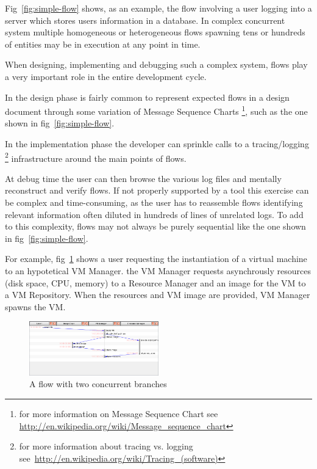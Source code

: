 \documentclass[11pt, twoside, titlepage]{book}
\begin{document}
Fig~\ref{fig:simple-flow} shows, as an example, the flow involving a user
logging into a server which stores users information in a database. 
In complex concurrent system multiple homogeneous or heterogeneous flows
spawning tens or hundreds of entities may be in execution at any point in time.  
  
When designing, implementing and debugging such a complex system, flows play a
very important role in the entire development cycle. 

In the design phase is fairly common to represent expected flows in a design
document through some variation of Message Sequence Charts
\footnote{for more information on Message Sequence Chart see~
\href{http://en.wikipedia.org/wiki/Message\_sequence\_chart}
{http://en.wikipedia.org/wiki/Message\_sequence\_chart}}, such as the one shown
in fig~\ref{fig:simple-flow}.

In the implementation phase the developer can sprinkle calls to a
tracing/logging \footnote{ for more information about tracing vs.
logging
see~\href{http://en.wikipedia.org/wiki/Tracing\_(software)}
{http://en.wikipedia.org/wiki/Tracing\_(software)}} infrastructure
around the main points of flows.
  
At debug time
the user can then browse the various log files and mentally reconstruct and
verify flows. If not properly supported by a tool this exercise can be complex
and time-consuming, as the user has to reassemble flows identifying relevant
information often diluted in hundreds of lines of unrelated logs. To add to this
complexity, flows may not always be purely sequential like the one shown in
fig~\ref{fig:simple-flow}. 

For example, fig~\ref{fig:concurrent-flow} shows a user requesting the
instantiation of a virtual machine to an hypotetical VM Manager. the VM Manager
requests asynchrously resources (disk space, CPU, memory) to a Resource Manager
and an image for the VM to a VM Repository. When the resources and VM image are
provided, VM Manager spawns the VM.

\begin{figure}[ht!]
  \centering
  \includegraphics[width=0.5\textwidth,natwidth=1024,natheight=600]{images/concurrent-flow.png}
  \caption{A flow with two concurrent branches}
  \label{fig:concurrent-flow} 
\end{figure}  
\end{document}
